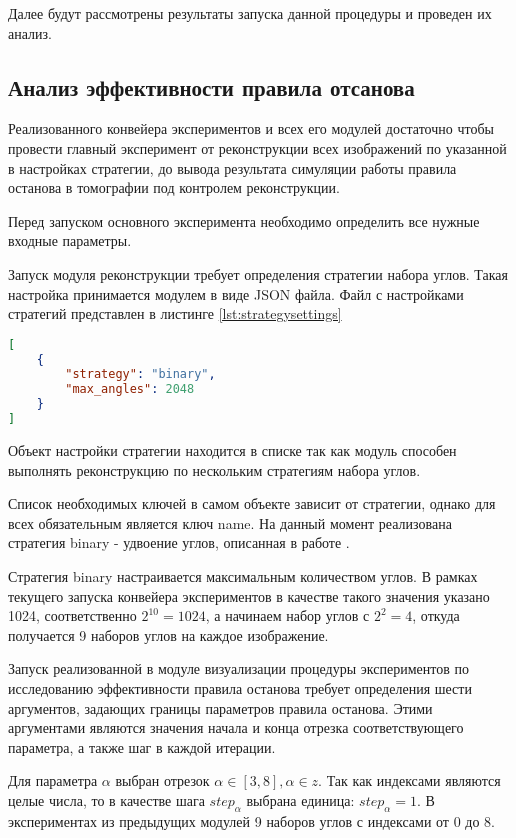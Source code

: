 Далее будут рассмотрены результаты запуска данной процедуры и проведен их анализ.

\subsection{Анализ эффективности правила отсанова}

Реализованного конвейера экспериментов и всех его модулей достаточно чтобы провести главный эксперимент от реконструкции всех изображений по указанной в настройках стратегии, до вывода результата симуляции работы правила останова в томографии под контролем реконструкции.

Перед запуском основного эксперимента необходимо определить все нужные входные параметры.

Запуск модуля реконструкции требует определения стратегии набора углов. Такая настройка принимается модулем в виде JSON файла. Файл с настройками стратегий представлен в листинге \ref*{lst:strategysettings}

\begin{lstlisting}[language=json, caption={Файл конфигурации стратегий набора углов для конвейера экспериментов}, label={lst:strategysettings}]
[
    {
        "strategy": "binary",
        "max_angles": 2048
    }
]
\end{lstlisting}

Объект настройки стратегии находится в списке так как модуль способен выполнять реконструкцию по нескольким стратегиям набора углов.

Список необходимых ключей в самом объекте зависит от стратегии, однако для всех обязательным является ключ name. На данный момент реализована стратегия binary - удвоение углов, описанная в работе \cite{gilmanov2024applicability}.

Стратегия binary настраивается максимальным количеством углов. В рамках текущего запуска конвейера экспериментов в качестве такого значения указано 1024, соответственно \(2^{10} = 1024\), а начинаем набор углов с \(2^2 = 4\), откуда получается 9 наборов углов на каждое изображение.

Запуск реализованной в модуле визуализации процедуры экспериментов по исследованию эффективности правила останова требует определения шести аргументов, задающих границы параметров правила останова. Этими аргументами являются значения начала и конца отрезка соответствующего параметра, а также шаг в каждой итерации.

Для параметра \(\alpha\) выбран отрезок \(\alpha \in [3, 8], \alpha \in z\). Так как индексами являются целые числа, то в качестве шага \(step_{\alpha}\) выбрана единица: \(step_{\alpha} = 1\). В экспериментах из предыдущих модулей 9 наборов углов с индексами от 0 до 8.

